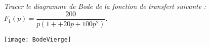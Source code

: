 \setcounter{exo}{0}
\subparagraph{}\textit{Tracer le diagramme de Bode de la fonction de transfert suivante : $F_1(p)=\dfrac{200}{p\left(1++20p+100p^2\right)}$.}
\begin{center}
\texttt{[image: BodeVierge]}
\end{center}
